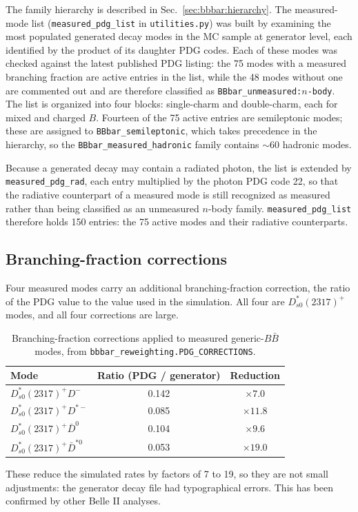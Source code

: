 The family hierarchy is described in Sec.~\ref{sec:bbbar:hierarchy}.
The measured-mode list (\texttt{measured\_pdg\_list} in
\texttt{utilities.py}) was built by examining the most populated generated
decay modes in the MC sample at generator level, each identified by the
product of its daughter PDG codes.
Each of these modes was checked against the latest published PDG listing: the
75 modes with a measured branching fraction are active entries in the list,
while the 48 modes without one are commented out and are therefore classified
as \texttt{BBbar\_unmeasured:$n$-body}.
The list is organized into four blocks: single-charm and double-charm, each
for mixed and charged $B$.
Fourteen of the 75 active entries are semileptonic modes; these are assigned
to \texttt{BBbar\_semileptonic}, which takes precedence in the hierarchy, so
the \texttt{BBbar\_measured\_hadronic} family contains $\sim 60$ hadronic
modes.

Because a generated decay may contain a radiated photon, the list is extended
by \texttt{measured\_pdg\_rad}, each entry multiplied by the photon PDG code
22, so that the radiative counterpart of a measured mode is still recognized
as measured rather than being classified as an unmeasured $n$-body family.
\texttt{measured\_pdg\_list} therefore holds 150 entries: the 75 active
modes and their radiative counterparts.


\subsection{Branching-fraction corrections}
\label{app:categories:bf}

Four measured modes carry an additional branching-fraction correction, the
ratio of the PDG value to the value used in the simulation.
All four are $D_{s0}^{*}(2317)^{+}$ modes, and all four corrections are large.

\begin{table}[htbp]
  \centering
  \caption{Branching-fraction corrections applied to measured
  generic-$B\bar{B}$ modes, from \texttt{bbbar\_reweighting.PDG\_CORRECTIONS}.}
  \label{tab:bf-corrections}
  \small
  \begin{tabular}{l c c}
    \hline
    Mode & Ratio (PDG / generator) & Reduction \\
    \hline
    $D_{s0}^{*}(2317)^{+} D^{-}$        & 0.142 & $\times 7.0$ \\
    $D_{s0}^{*}(2317)^{+} D^{*-}$       & 0.085 & $\times 11.8$ \\
    $D_{s0}^{*}(2317)^{+} \bar{D}^{0}$  & 0.104 & $\times 9.6$ \\
    $D_{s0}^{*}(2317)^{+} \bar{D}^{*0}$ & 0.053 & $\times 19.0$ \\
    \hline
  \end{tabular}
\end{table}

These reduce the simulated rates by factors of 7 to 19, so they are not small
adjustments: the generator decay file had typographical errors. This has been confirmed 
by other Belle II analyses.


